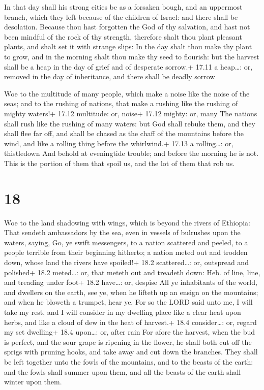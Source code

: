  In that day shall his strong cities be as a forsaken
bough, and an uppermost branch, which they left because of the children
of Israel: and there shall be desolation.  Because thou
hast forgotten the God of thy salvation, and hast not been mindful of
the rock of thy strength, therefore shalt thou plant pleasant plants,
and shalt set it with strange slips:  In the day shalt thou
make thy plant to grow, and in the morning shalt thou make thy seed to
flourish: but the harvest shall be a heap in the day of grief and of
desperate sorrow.+ 17.11 a heap\ldots: or, removed in the day of
inheritance, and there shall be deadly sorrow

 Woe to the multitude of many people, which make a noise
like the noise of the seas; and to the rushing of nations, that make a
rushing like the rushing of mighty waters!+ 17.12 multitude: or, noise+
17.12 mighty: or, many  The nations shall rush like the
rushing of many waters: but God shall rebuke them, and they shall flee
far off, and shall be chased as the chaff of the mountains before the
wind, and like a rolling thing before the whirlwind.+ 17.13 a
rolling\ldots: or, thistledown  And behold at eveningtide
trouble; and before the morning he is not. This is the portion of them
that spoil us, and the lot of them that rob us.

\hypertarget{section-17}{%
\section{18}\label{section-17}}

 Woe to the land shadowing with wings, which is beyond the
rivers of Ethiopia:  That sendeth ambassadors by the sea,
even in vessels of bulrushes upon the waters, saying, Go, ye swift
messengers, to a nation scattered and peeled, to a people terrible from
their beginning hitherto; a nation meted out and trodden down, whose
land the rivers have spoiled!+ 18.2 scattered\ldots: or, outspread and
polished+ 18.2 meted\ldots: or, that meteth out and treadeth down: Heb.
of line, line, and treading under foot+ 18.2 have\ldots: or, despise
 All ye inhabitants of the world, and dwellers on the earth,
see ye, when he lifteth up an ensign on the mountains; and when he
bloweth a trumpet, hear ye.  For so the LORD said unto me, I
will take my rest, and I will consider in my dwelling place like a clear
heat upon herbs, and like a cloud of dew in the heat of harvest.+ 18.4
consider\ldots: or, regard my set dwelling+ 18.4 upon\ldots: or, after
rain  For afore the harvest, when the bud is perfect, and
the sour grape is ripening in the flower, he shall both cut off the
sprigs with pruning hooks, and take away and cut down the branches.
 They shall be left together unto the fowls of the
mountains, and to the beasts of the earth: and the fowls shall summer
upon them, and all the beasts of the earth shall winter upon them.

